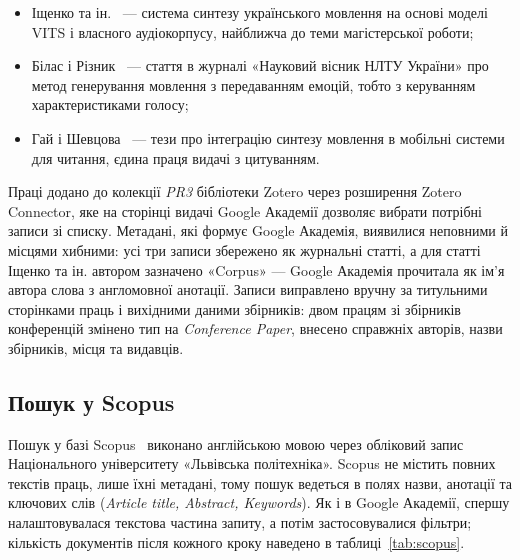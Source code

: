 \documentclass[14pt,a4paper]{extreport}
\begin{document}
\begin{itemize}
\item Іщенко та ін.~\cite{ishchenko2026} — система синтезу українського мовлення на основі моделі VITS і власного аудіокорпусу, найближча до теми магістерської роботи;
\item Білас і Різник~\cite{bilas2026} — стаття в журналі «Науковий вісник НЛТУ України» про метод генерування мовлення з передаванням емоцій, тобто з керуванням характеристиками голосу;
\item Гай і Шевцова~\cite{gay2026} — тези про інтеграцію синтезу мовлення в мобільні системи для читання, єдина праця видачі з цитуванням.
\end{itemize}

Праці додано до колекції \textit{PR3} бібліотеки Zotero через розширення Zotero Connector, яке на сторінці видачі Google Академії дозволяє вибрати потрібні записи зі списку. Метадані, які формує Google Академія, виявилися неповними й місцями хибними: усі три записи збережено як журнальні статті, а для статті Іщенко та ін. автором зазначено «Corpus» — Google Академія прочитала як ім'я автора слова з англомовної анотації. Записи виправлено вручну за титульними сторінками праць і вихідними даними збірників: двом працям зі збірників конференцій змінено тип на \textit{Conference Paper}, внесено справжніх авторів, назви збірників, місця та видавців.

\subsection{Пошук у Scopus}

Пошук у базі Scopus~\cite{scopus} виконано англійською мовою через обліковий запис Національного університету «Львівська політехніка». Scopus не містить повних текстів праць, лише їхні метадані, тому пошук ведеться в полях назви, анотації та ключових слів (\textit{Article title, Abstract, Keywords}). Як і в Google Академії, спершу налаштовувалася текстова частина запиту, а потім застосовувалися фільтри; кількість документів після кожного кроку наведено в таблиці~\ref{tab:scopus}.
\end{document}
